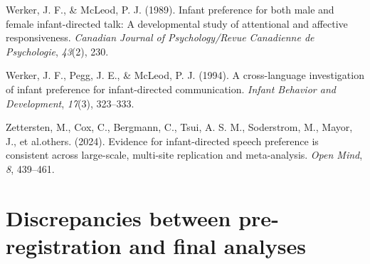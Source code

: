 \documentclass[
  ,man,floatsintext]{apa6}
\newlength{\cslhangindent}
\newlength{\cslentryspacingunit} %
\newenvironment{CSLReferences}[2] %
 {%
  \setlength{\parindent}{0pt}
  \ifodd #1
  \let\oldpar\par
  \def\par{\hangindent=\cslhangindent\oldpar}
  \fi
  \setlength{\parskip}{#2\cslentryspacingunit}
 }%
 {}
\begin{document}
\begin{CSLReferences}{1}{0}
\leavevmode{}%
Werker, J. F., \& McLeod, P. J. (1989). Infant preference for both male and female infant-directed talk: A developmental study of attentional and affective responsiveness. \emph{Canadian Journal of Psychology/Revue Canadienne de Psychologie}, \emph{43}(2), 230.

\leavevmode{}%
Werker, J. F., Pegg, J. E., \& McLeod, P. J. (1994). A cross-language investigation of infant preference for infant-directed communication. \emph{Infant Behavior and Development}, \emph{17}(3), 323--333.

\leavevmode{}%
Zettersten, M., Cox, C., Bergmann, C., Tsui, A. S. M., Soderstrom, M., Mayor, J., et al.others. (2024). Evidence for infant-directed speech preference is consistent across large-scale, multi-site replication and meta-analysis. \emph{Open Mind}, \emph{8}, 439--461.

\end{CSLReferences}

\endgroup

\newpage

\newpage

\hypertarget{appendix-appendix}{%
\appendix}


\hypertarget{discrepancies-between-pre-registration-and-final-analyses}{%
\section{Discrepancies between pre-registration and final analyses}\label{discrepancies-between-pre-registration-and-final-analyses}}
\end{document}
